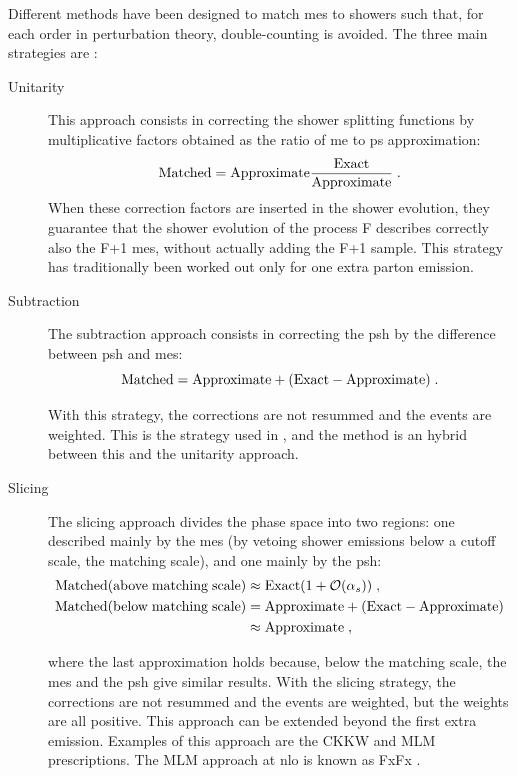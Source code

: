 Different methods have been designed to match \glspl{me} to showers such that, for each order in perturbation theory, double-counting is avoided. The three main strategies are \cite{Giele:2011cb}:
\begin{description}
\item[Unitarity] This approach consists in correcting the shower splitting functions by multiplicative factors obtained as the ratio of \gls{me} to \gls{ps} approximation:
$$
\rm{Matched} = \rm{Approximate}\frac{\rm{Exact}}{Approximate} \; .
$$
\noindent When these correction factors are inserted in the shower evolution, they guarantee that the shower evolution of the process F describes correctly also the F+1 \glspl{me}, without actually adding the F+1 sample. This strategy has traditionally been worked out only for one extra parton emission. 

\item[Subtraction] The subtraction approach consists in correcting the \gls{psh} by the difference between \gls{psh} and \glspl{me}:
$$
\rm{Matched} = \rm{Approximate} + (\rm{Exact}- \rm{Approximate}) \; .
$$

\noindent With this strategy, the corrections are not resummed and the events are weighted. This is the strategy used in \mcatnlo \cite{Frixione:2002ik,Frixione:2003ei,Frixione:2008ym}, and the \Powheg method \cite{Frixione:2007vw} is an hybrid between this and the unitarity approach.

\item[Slicing] The slicing approach divides the phase space into two regions: one described mainly by the \glspl{me} (by vetoing shower emissions below a cutoff scale, the matching scale), and one mainly by the \gls{psh}:
\begin{equation*}
\begin{split}
 {\rm{Matched (above \; matching \;  scale)}} &\approx {\rm{Exact}} (1 + {\mathcal{O}} ( \alpha_s)) \; , \\
{\rm{Matched (below \; matching \;  scale)} } &= {\rm{Approximate}} + ({\rm{Exact}}- {\rm{Approximate}})  \\
& \approx {\rm{Approximate}}    \; ,
\end{split}
\end{equation*}


\noindent where the last approximation holds because, below the matching scale, the \glspl{me} and the \gls{psh} give similar results. 
With the slicing strategy, the corrections are not resummed and the events are weighted, but the weights are all positive. This approach can be extended beyond the first extra emission. 
Examples of this approach are the CKKW \cite{Catani:2001cc} and MLM \cite{Mangano:2006rw,Mrenna:2003if} prescriptions. The MLM approach at \gls{nlo} is known as FxFx \cite{Frederix:2012ps}. 

\end{description}


